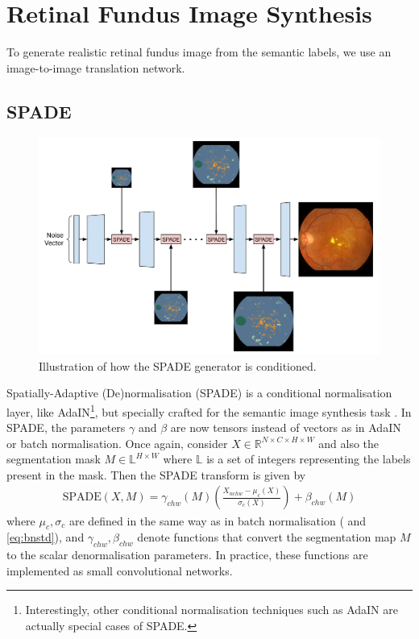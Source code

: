\chapter{Retinal Fundus Image Synthesis} \label{cha:retinas}

To generate realistic retinal fundus image from the semantic labels, we use an image-to-image translation network.

\section{SPADE}

\begin{figure}[h]
    \centering
    \includegraphics[width=\textwidth]{retinas/figs/spade-arch.pdf}
    \caption{Illustration of how the SPADE generator is conditioned.}
    \label{fig:spadearch}
\end{figure}

Spatially-Adaptive (De)normalisation (SPADE) is a conditional normalisation layer, like AdaIN\footnote{Interestingly, other conditional normalisation techniques such as AdaIN are actually special cases of SPADE.}, but specially crafted for the semantic image synthesis task \cite{spade}.
In SPADE, the parameters $\gamma$ and $\beta$ are now tensors instead of vectors as in AdaIN or batch normalisation. Once again, consider $X \in \mathbb{R}^{N\times C\times H\times W}$ and also the segmentation mask $M \in \mathbb{L}^{H\times W}$ where $\mathbb{L}$ is a set of integers representing the labels present in the mask. Then the SPADE transform is given by
\begin{align}
    \text{SPADE}(X, M) = \gamma_{chw}(M) \left( \frac{ X_{nchw} - \mu_c(X)}{\sigma_c(X)} \right) + \beta_{chw}(M)
\end{align}
where $\mu_c, \sigma_c$ are defined in the same way as in batch normalisation ( and \eqref{eq:bnstd}), and $\gamma_{chw}, \beta_{chw}$ denote functions that convert the segmentation map $M$ to the scalar denormalisation parameters. In practice, these functions are implemented as small convolutional networks.

